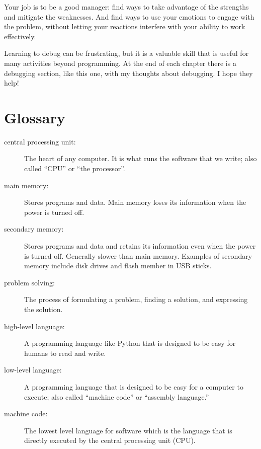 \documentclass[10pt]{book}
\begin{document}
Your job is to be a good manager: find ways to take advantage
of the strengths and mitigate the weaknesses.  And find ways
to use your emotions to engage with the problem,
without letting your reactions interfere with your ability
to work effectively.

Learning to debug can be frustrating, but it is a valuable skill
that is useful for many activities beyond programming.  At the
end of each chapter there is a debugging section, like this one,
with my thoughts about debugging.  I hope they help!


\section{Glossary}

\begin{description}

\item[central processing unit:] The heart of any computer.  It is what
runs the software that we write; also called ``CPU'' or ``the processor''.

\item[main memory:] Stores programs and data.  Main memory loses 
its information when the power is turned off.

\item[secondary memory:] Stores programs and data and retains its 
information even when the power is turned off.  Generally slower 
than main memory.  Examples of secondary memory include disk 
drives and flash member in USB sticks.

\item[problem solving:]  The process of formulating a problem, finding
a solution, and expressing the solution.

\item[high-level language:]  A programming language like Python that
is designed to be easy for humans to read and write.

\item[low-level language:]  A programming language that is designed
to be easy for a computer to execute; also called ``machine code'' or
``assembly language.''

\item[machine code:]  The lowest level language for software which 
is the language that is directly executed by the central processing unit 
(CPU).


\end{description}
\end{document}
